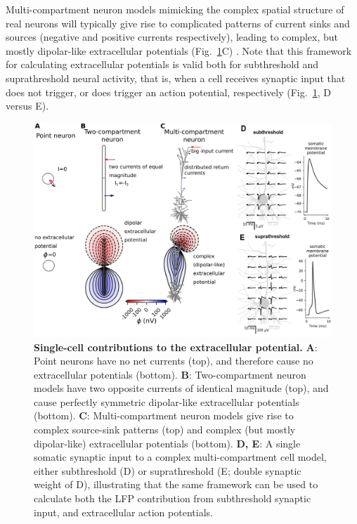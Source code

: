 \documentclass[preprint,11pt,authoryear]{elsarticle}
\begin{document}
Multi-compartment neuron models mimicking the complex spatial structure of real neurons will typically give rise to complicated patterns of current sinks and sources (negative and positive currents respectively), leading to complex, but mostly dipolar-like extracellular potentials (Fig.~\ref{fig:EP_morph}C) \citep{Einevoll2013}.
Note that this framework for calculating extracellular potentials is valid both for subthreshold and suprathreshold neural activity, that is, when a cell receives synaptic input that does not trigger, or does trigger an action potential, respectively (Fig.~\ref{fig:EP_morph}, D versus E).

\begin{figure}[!ht]
\begin{center}
\includegraphics[width=1\textwidth]{single_cell_EP}
\end{center}
\caption{\textbf{Single-cell contributions to the extracellular potential.} 
{\bf A}: Point neurons have no net currents (top), and therefore cause no extracellular potentials (bottom). 
{\bf B}: Two-compartment neuron models have two opposite currents
of identical magnitude (top), and cause perfectly symmetric dipolar-like extracellular potentials (bottom). 
{\bf C}: Multi-compartment neuron models \citep{Hay2011} give rise to complex source-sink patterns (top) and complex (but mostly dipolar-like) extracellular potentials (bottom). 
{\bf D, E}: A single somatic synaptic input to a complex multi-compartment cell model, either subthreshold (D) or suprathreshold (E; double synaptic weight of D), illustrating that the same framework can be used to calculate both the LFP contribution from subthreshold synaptic input, and extracellular action potentials. 
}
\label{fig:EP_morph}
\end{figure}
\end{document}
